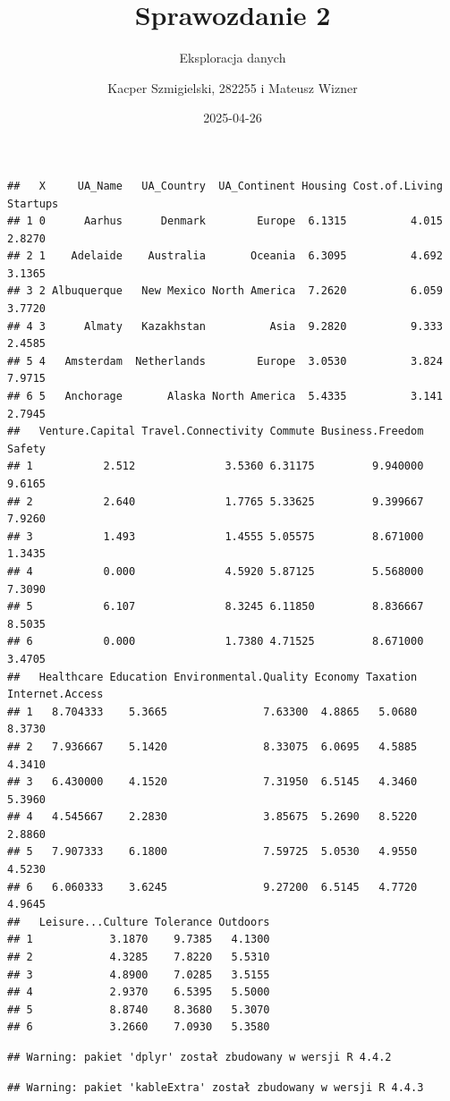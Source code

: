 \documentclass[
  12pt,
]{article}
\title{Sprawozdanie 2}
\subtitle{Eksploracja danych}
\author{Kacper Szmigielski, 282255 i Mateusz Wizner}
\date{2025-04-26}
\begin{document}
\maketitle

{
\setcounter{tocdepth}{3}
\tableofcontents
}
\begin{verbatim}
##   X     UA_Name   UA_Country  UA_Continent Housing Cost.of.Living Startups
## 1 0      Aarhus      Denmark        Europe  6.1315          4.015   2.8270
## 2 1    Adelaide    Australia       Oceania  6.3095          4.692   3.1365
## 3 2 Albuquerque   New Mexico North America  7.2620          6.059   3.7720
## 4 3      Almaty   Kazakhstan          Asia  9.2820          9.333   2.4585
## 5 4   Amsterdam  Netherlands        Europe  3.0530          3.824   7.9715
## 6 5   Anchorage       Alaska North America  5.4335          3.141   2.7945
##   Venture.Capital Travel.Connectivity Commute Business.Freedom Safety
## 1           2.512              3.5360 6.31175         9.940000 9.6165
## 2           2.640              1.7765 5.33625         9.399667 7.9260
## 3           1.493              1.4555 5.05575         8.671000 1.3435
## 4           0.000              4.5920 5.87125         5.568000 7.3090
## 5           6.107              8.3245 6.11850         8.836667 8.5035
## 6           0.000              1.7380 4.71525         8.671000 3.4705
##   Healthcare Education Environmental.Quality Economy Taxation Internet.Access
## 1   8.704333    5.3665               7.63300  4.8865   5.0680          8.3730
## 2   7.936667    5.1420               8.33075  6.0695   4.5885          4.3410
## 3   6.430000    4.1520               7.31950  6.5145   4.3460          5.3960
## 4   4.545667    2.2830               3.85675  5.2690   8.5220          2.8860
## 5   7.907333    6.1800               7.59725  5.0530   4.9550          4.5230
## 6   6.060333    3.6245               9.27200  6.5145   4.7720          4.9645
##   Leisure...Culture Tolerance Outdoors
## 1            3.1870    9.7385   4.1300
## 2            4.3285    7.8220   5.5310
## 3            4.8900    7.0285   3.5155
## 4            2.9370    6.5395   5.5000
## 5            8.8740    8.3680   5.3070
## 6            3.2660    7.0930   5.3580
\end{verbatim}

\begin{verbatim}
## Warning: pakiet 'dplyr' został zbudowany w wersji R 4.4.2
\end{verbatim}

\begin{verbatim}
## Warning: pakiet 'kableExtra' został zbudowany w wersji R 4.4.3
\end{verbatim}
\end{document}
